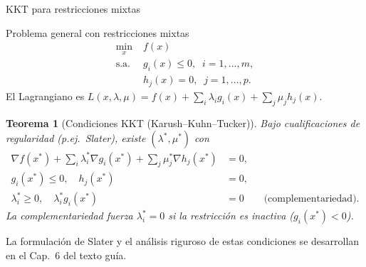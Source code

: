 \documentclass[10pt,aspectratio=169]{beamer}
\theoremstyle{definition}
\theoremstyle{plain}
\newtheorem{teorema}{Teorema}
\begin{document}
\begin{frame}[t]{KKT para restricciones mixtas}
  \begin{block}{Problema general con restricciones mixtas}
    \begin{align*}
      \min_{x}\;     & f(x) \\
      \text{s.a. } & g_{i}(x)\leq 0,\;\; i=1,\dots,m,\\
                   & h_{j}(x)=0,\;\; j=1,\dots,p.
    \end{align*}
    El Lagrangiano es
    $L(x,\lambda,\mu)=f(x)+\sum_{i}\lambda_{i}g_{i}(x)+\sum_{j}\mu_{j}h_{j}(x)$.
  \end{block}

  \vspace{0.2em}
  \begin{teorema}[Condiciones KKT (Karush--Kuhn--Tucker)]
    Bajo cualificaciones de regularidad (p.ej.\ Slater), existe
    $(\lambda^{*},\mu^{*})$ con
    \begin{align*}
      \nabla f(x^{*}) + \textstyle\sum_{i}\lambda_{i}^{*}\nabla g_{i}(x^{*})
                                   + \sum_{j}\mu_{j}^{*}\nabla h_{j}(x^{*}) &= 0,\\
      g_{i}(x^{*}) \leq 0,\quad h_{j}(x^{*}) &= 0,\\
      \lambda_{i}^{*}\geq 0,\quad \lambda_{i}^{*}g_{i}(x^{*}) &= 0
      \qquad\text{(complementariedad)}.
    \end{align*}
    La \emph{complementariedad} fuerza $\lambda_{i}^{*}=0$ si la restricción
    es \emph{inactiva} ($g_{i}(x^{*})<0$).
  \end{teorema}

  \vspace{0.2em}
  La formulación de Slater y el análisis riguroso de estas condiciones se
  desarrollan en el Cap.~6 del texto guía.
\end{frame}
\end{document}
